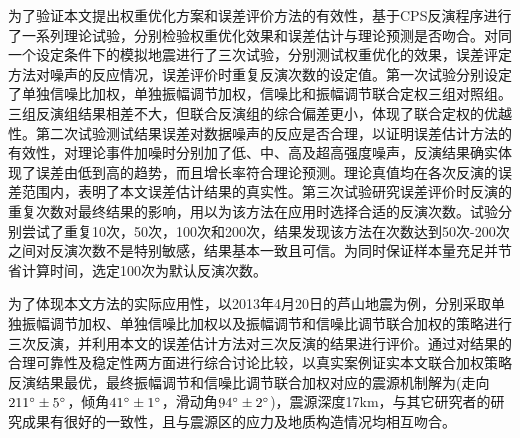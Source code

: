 为了验证本文提出权重优化方案和误差评价方法的有效性，基于CPS反演程序进行了一系列理论试验，分别检验权重优化效果和误差估计与理论预测是否吻合。对同一个设定条件下的模拟地震进行了三次试验，分别测试权重优化的效果，误差评定方法对噪声的反应情况，误差评价时重复反演次数的设定值。第一次试验分别设定了单独信噪比加权，单独振幅调节加权，信噪比和振幅调节联合定权三组对照组。三组反演组结果相差不大，但联合反演组的综合偏差更小，体现了联合定权的优越性。第二次试验测试结果误差对数据噪声的反应是否合理，以证明误差估计方法的有效性，对理论事件加噪时分别加了低、中、高及超高强度噪声，反演结果确实体现了误差由低到高的趋势，而且增长率符合理论预测。理论真值均在各次反演的误差范围内，表明了本文误差估计结果的真实性。第三次试验研究误差评价时反演的重复次数对最终结果的影响，用以为该方法在应用时选择合适的反演次数。试验分别尝试了重复10次，50次，100次和200次，结果发现该方法在次数达到50次-200次之间对反演次数不是特别敏感，结果基本一致且可信。为同时保证样本量充足并节省计算时间，选定100次为默认反演次数。

为了体现本文方法的实际应用性，以2013年4月20日的芦山地震为例，分别采取单独振幅调节加权、单独信噪比加权以及振幅调节和信噪比调节联合加权的策略进行三次反演，并利用本文的误差估计方法对三次反演的结果进行评价。通过对结果的合理可靠性及稳定性两方面进行综合讨论比较，以真实案例证实本文联合加权策略反演结果最优，最终振幅调节和信噪比调节联合加权对应的震源机制解为(走向$211^\circ\pm5^\circ$，倾角$41^\circ\pm1^\circ$，滑动角$94^\circ\pm2^\circ$)，震源深度17km，与其它研究者的研究成果有很好的一致性，且与震源区的应力及地质构造情况均相互吻合。
